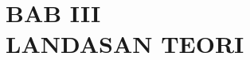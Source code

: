 \documentclass[12pt]{article}
\begin{document}

\section[BAB III LANDASAN TEORI]{BAB III\\LANDASAN TEORI}
\setcounter{table}{0}
\setcounter{figure}{0}
\end{document}
